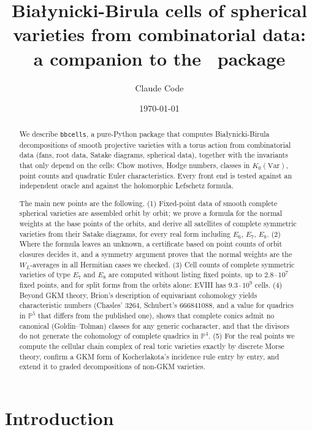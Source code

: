 \documentclass[11pt]{amsart}
\title[Bia{\l}ynicki-Birula cells of spherical varieties]{Bia{\l}ynicki-Birula
cells of spherical varieties from combinatorial data:\\ a companion to the
\bbcells\ package}
\author{Claude Code}
\date{\today}
\theoremstyle{definition}
\theoremstyle{remark}
\newcommand{\bbcells}{\texttt{bbcells}}
\newcommand{\PP}{\mathbb{P}}
\begin{document}
\begin{abstract}
We describe \bbcells, a pure-Python package that computes
Bia{\l}ynicki-Birula decompositions of smooth projective varieties with a
torus action from combinatorial data (fans, root data, Satake diagrams,
spherical data), together with the invariants that only depend on the
cells: Chow motives, Hodge numbers, classes in $K_0(\mathrm{Var})$, point
counts and quadratic Euler characteristics. Every front end is tested
against an independent oracle and against the holomorphic Lefschetz
formula.

The main new points are the following.
(1) Fixed-point data of smooth complete spherical varieties are assembled
orbit by orbit; we prove a formula for the normal weights at the base
points of the orbits, and derive all satellites of complete symmetric
varieties from their Satake diagrams, for every real form including
$E_6$, $E_7$, $E_8$.
(2) Where the formula leaves an unknown, a certificate based on point
counts of orbit closures decides it, and a symmetry argument proves that
the normal weights are the $W_L$-averages in all Hermitian cases we
checked.
(3) Cell counts of complete symmetric varieties of type $E_7$ and $E_8$
are computed without listing fixed points, up to $2.8\cdot 10^7$ fixed
points, and for split forms from the orbits alone: EVIII has
$9.3\cdot10^9$ cells.
(4) Beyond GKM theory, Brion's description of equivariant cohomology yields
characteristic numbers (Chasles' $3264$, Schubert's $666841088$, and a value
for quadrics in $\PP^5$ that differs from the published one), shows that
complete conics admit no canonical (Goldin--Tolman) classes for any generic
cocharacter, and that the divisors do not generate the cohomology of
complete quadrics in $\PP^4$.
(5) For the real points we compute the cellular chain complex of real toric
varieties exactly by discrete Morse theory, confirm a GKM form of
Kocherlakota's incidence rule entry by entry, and extend it to graded
decompositions of non-GKM varieties.
\end{abstract}

\maketitle
\tableofcontents

\section{Introduction}\label{sec:intro}
\end{document}
